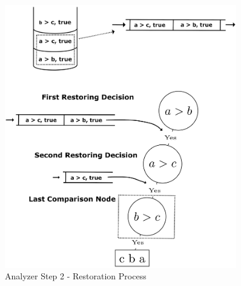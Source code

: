 \documentclass[final]{beamer}
\newlength{\onecolwid}
\newlength{\twocolwid}
\newlength{\onecolwidmid}
\begin{document}
\begin{frame}[t]
\begin{columns}[t]
\begin{column}{\twocolwid}
\begin{columns}[t,totalwidth=\twocolwid]
\begin{column}{\onecolwidmid}

\end{column} %

\begin{column}{\onecolwidmid} %


\begin{figure}
\includegraphics[width=0.8\linewidth]{figures/bubble_sort_step_2_formatted.png}
\caption{Analyzer Step 2 - Restoration Process}
\label{analyzer:2}
\end{figure}


\end{column} %

\begin{column}{\onecolwidmid} %



\end{column}
\end{columns}
\end{column}
\end{columns}
\end{frame}
\end{document}
